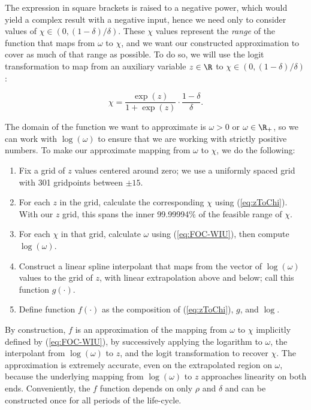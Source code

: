 \documentclass{article}
\newcommand{\CRRA}{\rho}
\begin{document}
The expression in square brackets is raised to a negative power, which would yield a complex result with a negative input, hence we need only to consider values of $\chi \in (0, (1 -\delta)/\delta)$. These $\chi$ values represent the \textit{range} of the function that maps from $\omega$ to $\chi$, and we want our constructed approximation to cover as much of that range as possible. To do so, we will use the logit transformation to map from an auxiliary variable $z \in \R$ to $\chi \in (0, (1 -\delta)/\delta)$:

\begin{equation}
\label{eq:zToChi}
\chi = \frac{\exp(z)}{1 + \exp(z)} \cdot \frac{1-\delta}{\delta}.
\end{equation}

The domain of the function we want to approximate is $\omega > 0$ or $\omega \in \R_+$, so we can work with $\log(\omega)$ to ensure that we are working with strictly positive numbers. To make our approximate mapping from $\omega$ to $\chi$, we do the following:

\begin{enumerate}
\item Fix a grid of $z$ values centered around zero; we use a uniformly spaced grid with 301 gridpoints between $\pm 15$.


\item For each $z$ in the grid, calculate the corresponding $\chi$ using (\ref{eq:zToChi}). With our $z$ grid, this spans the inner 99.99994\% of the feasible range of $\chi$.


\item For each $\chi$ in that grid, calculate $\omega$ using (\ref{eq:FOC-WIU}), then compute $\log(\omega)$.


\item Construct a linear spline interpolant that maps from the vector of $\log(\omega)$ values to the grid of $z$, with linear extrapolation above and below; call this function $g(\cdot)$.


\item Define function $f(\cdot)$ as the composition of (\ref{eq:zToChi}), $g$, and $\log$.
\end{enumerate}

By construction, $f$ is an approximation of the mapping from $\omega$ to $\chi$ implicitly defined by (\ref{eq:FOC-WIU}), by successively applying the logarithm to $\omega$, the interpolant from $\log(\omega)$ to $z$, and the logit transformation to recover $\chi$. The approximation is extremely accurate, even on the extrapolated region on $\omega$, because the underlying mapping from $\log(\omega)$ to $z$ approaches linearity on both ends. Conveniently, the $f$ function depends on only $\CRRA$ and $\delta$ and can be constructed once for all periods of the life-cycle.
\end{document}
